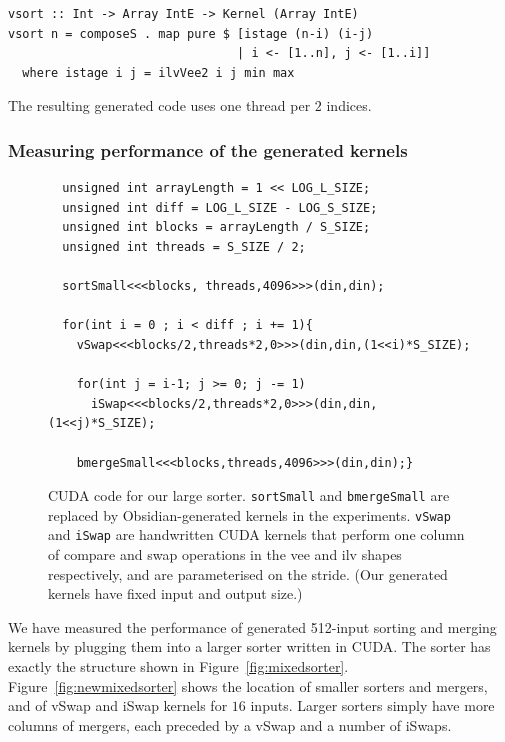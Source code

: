\begin{codesize}
\begin{verbatim}
vsort :: Int -> Array IntE -> Kernel (Array IntE)
vsort n = composeS . map pure $ [istage (n-i) (i-j) 
                                | i <- [1..n], j <- [1..i]]
  where istage i j = ilvVee2 i j min max
\end{verbatim}
\end{codesize}

\noindent
The resulting generated code uses one thread per
$2$ indices.

\subsubsection{Measuring performance of the generated kernels}\label{sec:benchmarks}
\begin{figure}
\begin{codesize}
\begin{verbatim}
  unsigned int arrayLength = 1 << LOG_L_SIZE;
  unsigned int diff = LOG_L_SIZE - LOG_S_SIZE;
  unsigned int blocks = arrayLength / S_SIZE;
  unsigned int threads = S_SIZE / 2;
  
  sortSmall<<<blocks, threads,4096>>>(din,din);
 
  for(int i = 0 ; i < diff ; i += 1){ 
    vSwap<<<blocks/2,threads*2,0>>>(din,din,(1<<i)*S_SIZE);
     
    for(int j = i-1; j >= 0; j -= 1)
      iSwap<<<blocks/2,threads*2,0>>>(din,din,(1<<j)*S_SIZE);
      
    bmergeSmall<<<blocks,threads,4096>>>(din,din);}
\end{verbatim}
\end{codesize}
\caption{CUDA code for our large sorter. {\tt sortSmall} and {\tt bmergeSmall}
are replaced by Obsidian-generated kernels in the experiments. {\tt vSwap} and {\tt iSwap} are handwritten CUDA kernels
that perform one column of compare and swap operations in the vee and ilv shapes respectively, and are
parameterised on the stride. (Our generated kernels have fixed input and output size.)}
\label{fig:CUDAsort}
\end{figure}
We have measured the performance of generated 512-input sorting and merging kernels by plugging them into a larger sorter written in CUDA.
The sorter has exactly the structure shown in Figure~\ref{fig:mixedsorter}.
Figure~\ref{fig:newmixedsorter} shows the location of smaller sorters and mergers, and of vSwap and iSwap kernels for $16$ inputs.
Larger sorters simply have more columns of mergers, each preceded by a vSwap and a number of iSwaps.
